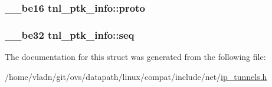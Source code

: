 \subsubsection[{proto}]{\setlength{\rightskip}{0pt plus 5cm}\+\_\+\+\_\+be16 tnl\+\_\+ptk\+\_\+info\+::proto}\label{structtnl__ptk__info_ac4f408097c387edf64653942d355985f}
\hypertarget{structtnl__ptk__info_ac8158dad50d130f9292c406776cce767}{}
\subsubsection[{seq}]{\setlength{\rightskip}{0pt plus 5cm}\+\_\+\+\_\+be32 tnl\+\_\+ptk\+\_\+info\+::seq}\label{structtnl__ptk__info_ac8158dad50d130f9292c406776cce767}


The documentation for this struct was generated from the following file\+:\begin{DoxyCompactItemize}
\item 
/home/vladn/git/ovs/datapath/linux/compat/include/net/\hyperlink{ip__tunnels_8h}{ip\+\_\+tunnels.\+h}\end{DoxyCompactItemize}
